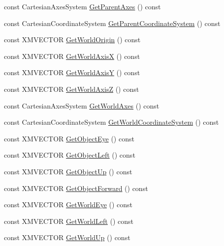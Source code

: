 \begin{DoxyCompactItemize}
\item 
const Cartesian\+Axes\+System \hyperlink{classmage_1_1_transform_node_aac33c894481ee82a5a0af2a4aeb2b9f8}{Get\+Parent\+Axes} () const
\item 
const Cartesian\+Coordinate\+System \hyperlink{classmage_1_1_transform_node_aff2b422a7d240d4d2278f2960e18b3bf}{Get\+Parent\+Coordinate\+System} () const
\item 
const X\+M\+V\+E\+C\+T\+OR \hyperlink{classmage_1_1_transform_node_aba58cc38ebed3fef3bd537fbb09e329a}{Get\+World\+Origin} () const
\item 
const X\+M\+V\+E\+C\+T\+OR \hyperlink{classmage_1_1_transform_node_a138fda019d9d42e483c5e50855e2df9f}{Get\+World\+AxisX} () const
\item 
const X\+M\+V\+E\+C\+T\+OR \hyperlink{classmage_1_1_transform_node_a13b1b983327adec0f2960e4388d2e6a7}{Get\+World\+AxisY} () const
\item 
const X\+M\+V\+E\+C\+T\+OR \hyperlink{classmage_1_1_transform_node_a932c9e84dd8b48d634d7c9f7315100e1}{Get\+World\+AxisZ} () const
\item 
const Cartesian\+Axes\+System \hyperlink{classmage_1_1_transform_node_ae49484fd95f20ada6c6b1100fd681c9c}{Get\+World\+Axes} () const
\item 
const Cartesian\+Coordinate\+System \hyperlink{classmage_1_1_transform_node_ae0347c5fe22cd16da1c6ff727275892d}{Get\+World\+Coordinate\+System} () const
\item 
const X\+M\+V\+E\+C\+T\+OR \hyperlink{classmage_1_1_transform_node_a1a3a2729e417697f0e3a1bb163ed9bb7}{Get\+Object\+Eye} () const
\item 
const X\+M\+V\+E\+C\+T\+OR \hyperlink{classmage_1_1_transform_node_aecea886df8ed9946ab2119ae365315bf}{Get\+Object\+Left} () const
\item 
const X\+M\+V\+E\+C\+T\+OR \hyperlink{classmage_1_1_transform_node_a4d209a7f35df862836c5e2f1badfd968}{Get\+Object\+Up} () const
\item 
const X\+M\+V\+E\+C\+T\+OR \hyperlink{classmage_1_1_transform_node_a2f3c5ea3a0a301181b611b808842c70a}{Get\+Object\+Forward} () const
\item 
const X\+M\+V\+E\+C\+T\+OR \hyperlink{classmage_1_1_transform_node_abbf6b99c7842fa93eb0ebe881abf4b07}{Get\+World\+Eye} () const
\item 
const X\+M\+V\+E\+C\+T\+OR \hyperlink{classmage_1_1_transform_node_a0a53b7d31fab72be41a6a6d789428d09}{Get\+World\+Left} () const
\item 
const X\+M\+V\+E\+C\+T\+OR \hyperlink{classmage_1_1_transform_node_a05d878f235e94b1814b24a790d738ba6}{Get\+World\+Up} () const

\end{DoxyCompactItemize}
